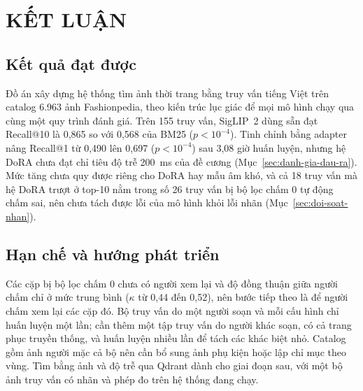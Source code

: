 \chapter*{KẾT LUẬN}

\section*{Kết quả đạt được}

Đồ án xây dựng hệ thống tìm ảnh thời trang bằng truy vấn tiếng Việt trên catalog 6.963 ảnh Fashionpedia, theo kiến trúc lục giác để mọi mô hình chạy qua cùng một quy trình đánh giá. Trên 155 truy vấn, SigLIP~2 dùng sẵn đạt Recall@10 là 0,865 so với 0,568 của BM25 ($p < 10^{-4}$). Tinh chỉnh bằng adapter nâng Recall@1 từ 0,490 lên 0,697 ($p < 10^{-4}$) sau 3,08 giờ huấn luyện, nhưng hệ DoRA chưa đạt chỉ tiêu độ trễ 200~ms của đề cương (Mục~\ref{sec:danh-gia-dau-ra}). Mức tăng chưa quy được riêng cho DoRA hay mẫu âm khó, và cả 18 truy vấn mà hệ DoRA trượt ở top-10 nằm trong số 26 truy vấn bị bộ lọc chấm 0 tự động chấm sai, nên chưa tách được lỗi của mô hình khỏi lỗi nhãn (Mục~\ref{sec:doi-soat-nhan}).

\section*{Hạn chế và hướng phát triển}

Các cặp bị bộ lọc chấm 0 chưa có người xem lại và độ đồng thuận giữa người chấm chỉ ở mức trung bình ($\kappa$ từ 0,44 đến 0,52), nên bước tiếp theo là để người chấm xem lại các cặp đó. Bộ truy vấn do một người soạn và mỗi cấu hình chỉ huấn luyện một lần; cần thêm một tập truy vấn do người khác soạn, có cả trang phục truyền thống, và huấn luyện nhiều lần để tách các khác biệt nhỏ. Catalog gồm ảnh người mặc cả bộ nên cần bổ sung ảnh phụ kiện hoặc lập chỉ mục theo vùng. Tìm bằng ảnh và độ trễ qua Qdrant dành cho giai đoạn sau, với một bộ ảnh truy vấn có nhãn và phép đo trên hệ thống đang chạy.
